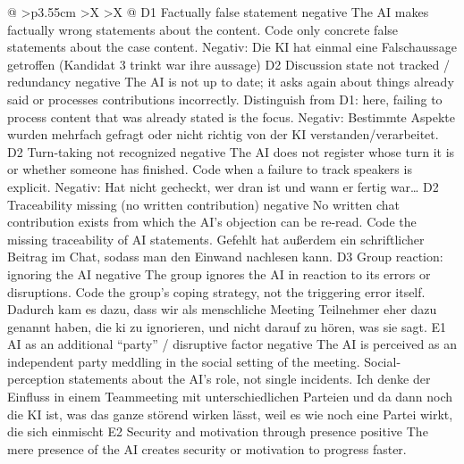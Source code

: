 \begin{xltabular}{\textwidth}{@{}
      >{\RaggedRight\arraybackslash}p{3.55cm}
      >{\RaggedRight\arraybackslash}X
      >{\RaggedRight\arraybackslash}X
    @{}}
    \cbgap
    \cbrow
      {D1}
      {Factually false statement}
      {negative}
      {The AI makes factually wrong statements about the content.}
      {Code only concrete false statements about the case content.}
      {Negativ: Die KI hat einmal eine Falschaussage getroffen (Kandidat 3 trinkt
      war ihre aussage)}
    \cbgap
    \cbrow
      {D2}
      {Discussion state not tracked / redundancy}
      {negative}
      {The AI is not up to date; it asks again about things already said or
      processes contributions incorrectly.}
      {Distinguish from D1: here, failing to process content that was already stated
      is the focus.}
      {Negativ: Bestimmte Aspekte wurden mehrfach gefragt oder nicht richtig von der
      KI verstanden/verarbeitet.}
    \cbgap
    \cbrow
      {D2}
      {Turn-taking not recognized}
      {negative}
      {The AI does not register whose turn it is or whether someone has finished.}
      {Code when a failure to track speakers is explicit.}
      {Negativ: Hat nicht gecheckt, wer dran ist und wann er fertig war…}
    \cbgap
    \cbrow
      {D2}
      {Traceability missing (no written contribution)}
      {negative}
      {No written chat contribution exists from which the AI's objection can be
      re-read.}
      {Code the missing traceability of AI statements.}
      {Gefehlt hat außerdem ein schriftlicher Beitrag im Chat, sodass man den
      Einwand nachlesen kann.}
    \cbcatbreak
    \cbrow
      {D3}
      {Group reaction: ignoring the AI}
      {negative}
      {The group ignores the AI in reaction to its errors or disruptions.}
      {Code the group's coping strategy, not the triggering error itself.}
      {Dadurch kam es dazu, dass wir als menschliche Meeting Teilnehmer eher dazu
      genannt haben, die ki zu ignorieren, und nicht darauf zu hören, was sie
      sagt.}
    \cbgap
    \cbrow
      {E1}
      {AI as an additional \enquote{party} / disruptive factor}
      {negative}
      {The AI is perceived as an independent party meddling in the social setting of
      the meeting.}
      {Social-perception statements about the AI's role, not single incidents.}
      {Ich denke der Einfluss in einem Teammeeting mit unterschiedlichen Parteien
      und da dann noch die KI ist, was das ganze störend wirken lässt, weil es wie
      noch eine Partei wirkt, die sich einmischt}
    \cbgap
    \cbrow
      {E2}
      {Security and motivation through presence}
      {positive}
      {The mere presence of the AI creates security or motivation to progress
      faster.}

\end{xltabular}
